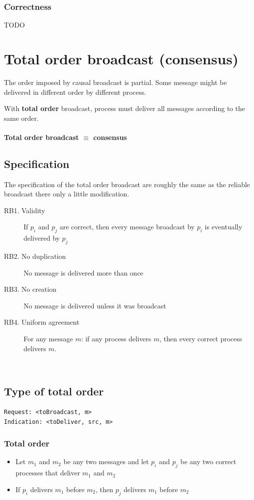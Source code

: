 \subsubsection{Correctness}
TODO

\section{Total order broadcast (consensus)}

The order imposed by causal broadcast is partial. Some message might
be delivered in different order by different process.

With \textbf{total order} broadcast, process must deliver all
messages according to the same order.

\paragraph{\textbf{Total order broadcast} $\equiv$ \textbf{consensus}}

\subsection{Specification}
The specification of the total order broadcast are roughly the same as the
reliable broadcast there only a little modification.

\begin{description}
    \item[RB1. Validity] If $p_i$ and $p_j$ are correct, then every message
    broadcast by $p_i$ is eventually delivered by $p_j$
    \item[RB2. No duplication] No message is delivered more than once
    \item[RB3. No creation] No message is delivered unless it was broadcast
	\item[RB4. Uniform agreement] For any message $m$: if any process delivers
	$m$, then every correct process delivers $m$.
\end{description}
\
\subsection{Type of total order}

\begin{lstlisting}
Request: <toBroadcast, m>
Indication: <toDeliver, src, m>
\end{lstlisting}

\subsubsection{Total order}
\begin{itemize}
	\item Let $m_1$ and $m_2$ be any two messages and let $p_i$ and $p_j$ be any
    two correct processes that deliver $m_1$ and $m_2$
	\item If $p_i$ delivers $m_1$ before $m_2$, then $p_j$ delivers $m_1$ before
    $m_2$
\end{itemize}

